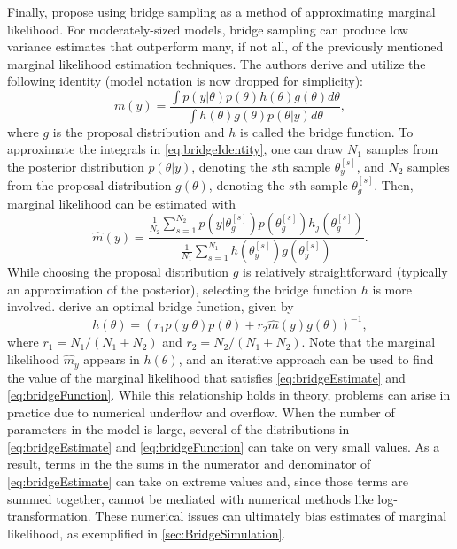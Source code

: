 \documentclass[twocolumn]{article}
\begin{document}
Finally, \cite{MengWong} propose using bridge sampling as a method of approximating marginal likelihood. For moderately-sized models, bridge sampling can produce low variance estimates that outperform many, if not all, of the previously mentioned marginal likelihood estimation techniques. The authors derive and utilize the following identity (model notation is now dropped for simplicity):
\begin{equation}
	\label{eq:bridgeIdentity}
	m(y) = \frac{\int p(y|\theta)p(\theta)h(\theta)g(\theta) d\theta}{\int h(\theta)g(\theta)p(\theta|y) d\theta},
\end{equation}
where $g$ is the proposal distribution and $h$ is called the bridge function. To approximate the integrals in \cref{eq:bridgeIdentity}, one can draw $N_1$ samples from the posterior distribution $p(\theta|y)$, denoting the $s$th sample $\theta_{y}^{[s]}$, and $N_2$ samples from the proposal distribution $g(\theta)$, denoting the $s$th sample $\theta_{g}^{[s]}$. Then, marginal likelihood can be estimated with
\begin{equation}
	\label{eq:bridgeEstimate}
	\hat{m}(y) = \frac{\frac{1}{N_2}\sum_{s=1}^{N_2} p\left(y|\theta_{g}^{[s]}\right)p\left(\theta_{g}^{[s]}\right)h_j\left(\theta_{g}^{[s]}\right)}{\frac{1}{N_1}\sum_{s=1}^{N_1} h\left(\theta_{y}^{[s]}\right)g\left(\theta_{y}^{[s]}\right)}.
\end{equation}
While choosing the proposal distribution $g$ is relatively straightforward (typically an approximation of the posterior), selecting the bridge function $h$ is more involved. \cite{MengWong} derive an optimal bridge function, given by
\begin{equation}
	\label{eq:bridgeFunction}
	h(\theta) = \left(r_1 p(y|\theta) p(\theta) + r_2 \hat{m}(y) g(\theta)\right)^{-1},
\end{equation}
where $r_1 = N_1 / (N_1 + N_2)$ and $r_2 = N_2 / (N_1 + N_2)$. Note that the marginal likelihood $\hat{m}_y$ appears in $h(\theta)$, and an iterative approach can be used to find the value of the marginal likelihood that satisfies \cref{eq:bridgeEstimate} and \cref{eq:bridgeFunction}. While this relationship holds in theory, problems can arise in practice due to numerical underflow and overflow. When the number of parameters in the model is large, several of the distributions in \cref{eq:bridgeEstimate} and \cref{eq:bridgeFunction} can take on very small values. As a result, terms in the the sums in the numerator and denominator of \cref{eq:bridgeEstimate} can take on extreme values and, since those terms are summed together, cannot be mediated with numerical methods like log-transformation. These numerical issues can ultimately bias estimates of marginal likelihood, as exemplified in \cref{sec:BridgeSimulation}.
\end{document}
